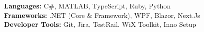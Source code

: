\textbf{Languages:} C\#, MATLAB, TypeScript, Ruby, Python\\
\textbf{Frameworks:} .NET (Core \& Framework), WPF, Blazor, Next.Js \\
\textbf{Developer Tools:} Git, Jira, TestRail, WiX Toolkit, Inno Setup 